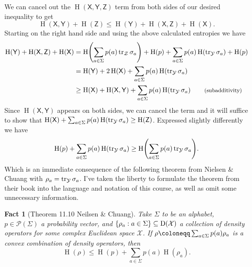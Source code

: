 \documentclass[boxes,pages,color=SeaGreen]{homework}
\newtheorem*{fact}{Fact}
\newcommand{\X}{\mathcal{X}}
\newcommand{\Y}{\mathcal{Y}}
\newcommand{\Z}{\mathcal{Z}}
\renewcommand{\P}{\mathcal{P}}
\newcommand{\reg}[1]{\mathsf{#1}}
\newcommand{\ent}{\operatorname{H}}
\newcommand{\smalltag}[1]{\tag*{\footnotesize (#1)}}
\newcommand{\Density}{\mathrm{D}}
\begin{document}
\begin{solution}
    We can cancel out the $\ent(\reg{X}, \reg{Y}, \reg{Z})$ term from both sides of our desired inequality to get
    \begin{equation*}
        \ent(\reg{X}, \reg{Y}) + \ent(\reg{Z}) \leq \ent(\reg{Y}) + \ent(\reg{X}, \reg{Z}) + \ent(\reg{X}).
    \end{equation*}
    Starting on the right hand side and using the above calculated entropies we have
    \begin{align*}
        \ent(\reg{Y}) + \ent(\reg{X}, \reg{Z}) + \ent(\reg{X}) & = \ent\!\qty(\sum_{a \in \Sigma} p(a)\tr_\Z\sigma_a) + \ent(p) + \sum_{a \in \Sigma} p(a)\ent(\tr_\Y\sigma_a) + \ent(p) \\
                                                               & = \ent(\reg{Y}) + 2\ent(\reg{X}) + \sum_{a \in \Sigma} p(a)\ent(\tr_\Y\sigma_a)                                         \\
                                                               & \geq \ent(\reg{X}) + \ent(\reg{X}, \reg{Y}) + \sum_{a \in \Sigma} p(a)\ent(\tr_\Y\sigma_a) \smalltag{subadditivity}
    \end{align*}
    Since $\ent(\reg{X}, \reg{Y})$ appears on both sides, we can cancel the term and it will suffice to show that $\ent(\reg{X}) + \sum_{a \in \Sigma} p(a)\ent(\tr_\Y\sigma_a) \geq \ent(\reg{Z})$.
    Expressed slightly differently we have
    \begin{equation*}
        \ent(p) + \sum_{a \in \Sigma} p(a)\ent(\tr_\Y\sigma_a) \geq \ent\!\qty(\sum_{a \in \Sigma} p(a) \tr_\Y\sigma_a).
    \end{equation*}
    Which is an immediate consequence of the following theorem from Nielsen \& Chuang with $\rho_a = \tr_\Y\sigma_a$.
    I've taken the liberty to formulate the theorem from their book into the language and notation of this course, as well as omit some unnecessary information.
    \begin{fact}[Theorem 11.10 Neilsen \& Chuang]
        Take $\Sigma$ to be an alphabet, $p \in \P(\Sigma)$ a probability vector, and $\qty{\rho_a : a \in \Sigma} \subseteq \Density(\X)$ a collection of density operators for some complex Euclidean space $\X$.
        If $\rho \defeq \sum_{a \in \Sigma} p(a)\rho_a$ is a convex combination of density operators, then
        \begin{equation*}
            \ent(\rho) \leq \ent(p) + \sum_{a \in \Sigma} p(a) \ent(\rho_a).
        \end{equation*}
    \end{fact}
\end{solution}
\end{document}
